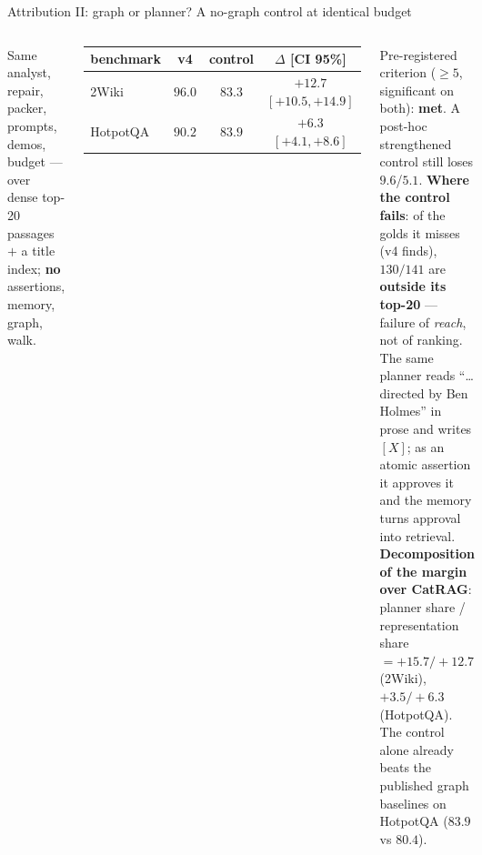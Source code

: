 \documentclass[aspectratio=169,10pt]{beamer}
\newcommand{\good}[1]{\textcolor{verde}{\textbf{#1}}}
\newcommand{\bad}[1]{\textcolor{teja}{\textbf{#1}}}
\begin{document}
\begin{frame}{Attribution II: graph or planner? A no-graph control at identical budget}
\begin{columns}[T]
\footnotesize
Same analyst, repair, packer, prompts, demos, budget --- over dense top-20
passages $+$ a title index; \textbf{no} assertions, memory, graph, walk.
\begin{center}\small
\begin{tabular}{lccc}
\toprule
benchmark & v4 & control & $\Delta$ [CI 95\%]\\
\midrule
2Wiki & $96.0$ & $83.3$ & \good{$+12.7$} $[+10.5,+14.9]$\\
HotpotQA & $90.2$ & $83.9$ & \good{$+6.3$} $[+4.1,+8.6]$\\
\bottomrule
\end{tabular}
\end{center}
\scriptsize Pre-registered criterion ($\ge5$, significant on both):
\good{met}. A post-hoc strengthened control still loses $9.6$/$5.1$.
\footnotesize
\textbf{Where the control fails}: of the golds it misses (v4 finds),
$130/141$ are \bad{outside its top-20} --- failure of \emph{reach}, not
of ranking. The same planner reads ``\dots directed by Ben Holmes'' in
prose and writes $[X]$; as an atomic assertion it approves it and the
memory turns approval into retrieval.\\[1mm]
\textbf{Decomposition of the margin over CatRAG}: planner share /
representation share $= +15.7/+12.7$ (2Wiki), $+3.5/+6.3$ (HotpotQA).
The control alone already beats the published graph baselines on HotpotQA
($83.9$ vs $80.4$).
\end{columns}
\end{frame}
\end{document}
